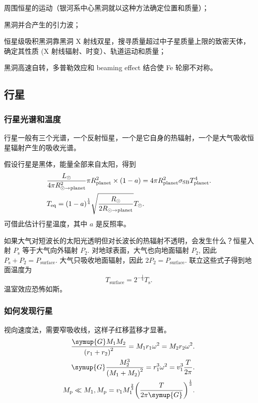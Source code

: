 \documentclass[../天体物理基础.tex]{subfiles}
\begin{document}
周围恒星的运动（银河系中心黑洞就以这种方法确定位置和质量）；

黑洞并合产生的引力波；

恒星级吸积黑洞靠黑洞 X 射线双星，搜寻质量超过中子星质量上限的致密天体，确定其性质 (X 射线辐射、时变）、轨道运动和质量；

黑洞高速自转，多普勒效应和 beaming effect 结合使 Fe 轮廓不对称。

\subsection{行星}
\subsubsection{行星光谱和温度}
行星一般有三个光谱，一个反射恒星，一个是它自身的热辐射，一个是大气吸收恒星辐射产生的吸收光谱。

假设行星是黑体，能量全部来自太阳，得到
\begin{align}
&\frac{L_{\odot}}{4\pi R^{2}_{\odot\to\mathrm{planet}}}\pi R_{\mathrm{planet}}^{2}\times\mleft(1-a\mright)=4\pi R_{\mathrm{planet}}^{2}\sigma_{\mathrm{SB}}T_{\mathrm{planet}}^{4}.\\
&T_{\mathrm{eq}}=\mleft(1-a\mright)^{\frac{1}{4}}\sqrt{\frac{R_{\odot}}{2R_{\odot\to\mathrm{planet}}}}T_{\odot}.
\end{align}
可借此估计行星温度，其中 $a$ 是反照率。

如果大气对短波长的太阳光透明但对长波长的热辐射不透明，会发生什么？恒星入射 $P_{\mathrm{s}}$ 等于大气向外辐射 $P_{2}$. 对地球表面，大气也向地面辐射 $P_{2}$, 因此 $P_{\mathrm{s}}+P_{2}=P_{\text{surface}}$. 大气只吸收地面辐射，因此 $2P_{2}=P_{\text{surface}}$. 联立这些式子得到地面温度为
\begin{equation}
T_{\text{surface}}=2^{-\frac{1}{4}}T_{\mathrm{s}}.
\end{equation}
温室效应恐怖如斯。

\subsubsection{如何发现行星}
视向速度法，需要窄吸收线，这样子红移蓝移才显著。
\begin{align}
\frac{\symup{G}M_{1}M_{2}}{\mleft(r_{1}+r_{2}\mright)^{2}}=M_{1}r_{1}\omega^{2}=M_{2}r_{2}\omega^{2}.\\
\symup{G}\frac{M_{2}^{3}}{\mleft(M_{1}+M_{2}\mright)^{2}}=r_{1}^{3}\omega^{2}=v_{1}^{3}\frac{T}{2\pi}.\\
M_{\mathrm{p}}\ll M_{1}, M_{\mathrm{p}}=v_{1}M_{1}^{\frac{2}{3}}\mleft(\frac{T}{2\pi\symup{G}}\mright)^{\frac{1}{3}}.
\end{align}
\end{document}
